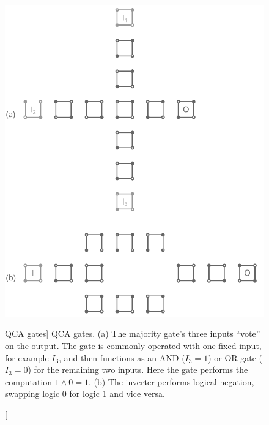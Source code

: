 \begin{figure}
  \center
  \includegraphics{gates}
  \caption
[QCA gates]
{
QCA gates. (a) The majority gate's three inputs ``vote'' on the output. The gate
is commonly operated with one fixed input, for example $I_3$, and then functions
as an AND ($I_3 = 1$) or OR gate ($I_3 = 0$) for the remaining two inputs. Here
the gate performs the computation $1 \land 0 = 1$. (b) The inverter performs
logical negation, swapping logic 0 for logic 1 and vice versa.
}
  \label{fig:gates}
\end{figure}


